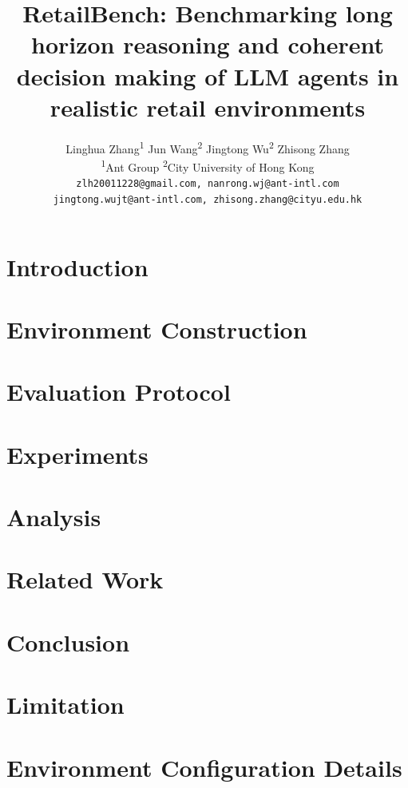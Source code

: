 \documentclass[11pt]{article}
\title{RetailBench: Benchmarking long horizon reasoning and coherent decision making of LLM agents in realistic retail environments}
\author{
Linghua Zhang\textsuperscript{1}
\quad
Jun Wang\textsuperscript{2}
\quad
Jingtong Wu\textsuperscript{2}
\quad
Zhisong Zhang\textsuperscript{\dag} \\
\textsuperscript{1}Ant Group
\quad
\textsuperscript{2}City University of Hong Kong \\
\texttt{zlh20011228@gmail.com, nanrong.wj@ant-intl.com} \\
\texttt{jingtong.wujt@ant-intl.com, zhisong.zhang@cityu.edu.hk}
}
\begin{document}
\maketitle
\begin{abstract}

\end{abstract}

\section{Introduction}
\label{sec:intro}


\section{Environment Construction}
\label{sec:env}


\section{Evaluation Protocol}
\label{sec:evaluation_protocol}


\section{Experiments}
\label{sec:experiment}


\section{Analysis}
\label{sec:failure_pattern_analysis}


\section{Related Work}
\label{sec:related_work}


\section{Conclusion}
\label{sec:conclusion}


\section{Limitation}
\label{sec:limitation}


%


\appendix
\section{Environment Configuration Details}
\label{appendix:env_details}

\end{document}
